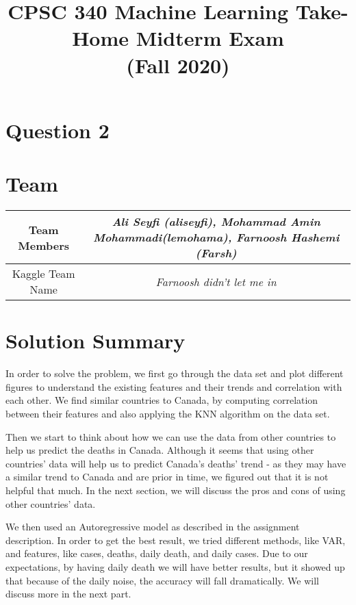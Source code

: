 \documentclass{article}
\begin{document}
\title{CPSC 340 Machine Learning Take-Home Midterm Exam\\ (Fall 2020)}
\date{}
\maketitle
\vspace{-12mm}
\section*{Question 2}
\setcounter{section}{0}

\section{Team}
\begin{center}
\begin{tabular}{|c | c |} 
\hline
Team Members & \emph{Ali Seyfi (aliseyfi), Mohammad Amin Mohammadi(lemohama), Farnoosh Hashemi (Farsh)} \\
\hline
Kaggle Team Name & \emph{Farnoosh didn't let me in}\\
\hline
\end{tabular}
\end{center}
\section{Solution Summary}
In order to solve the problem, we first go through the data set and plot different figures to understand the existing features and their trends and correlation with each other. We find similar countries to Canada, by computing correlation between their features and also applying the KNN algorithm on the data set.

Then we start to think about how we can use the data from other countries to help us predict the deaths in Canada. Although it seems that using other countries’ data will help us to predict Canada’s deaths’ trend - as they may have a similar trend to Canada and are prior in time, we figured out that it is not helpful that much. In the next section, we will discuss the pros and cons of using other countries’ data.

We then used an Autoregressive model as described in the assignment description. In order to get the best result, we tried different methods, like VAR, and features, like cases, deaths, daily death, and daily cases. Due to our expectations, by having daily death we will have better results, but it showed up that because of the daily noise, the accuracy will fall dramatically. We will discuss more in the next part.
\end{document}
